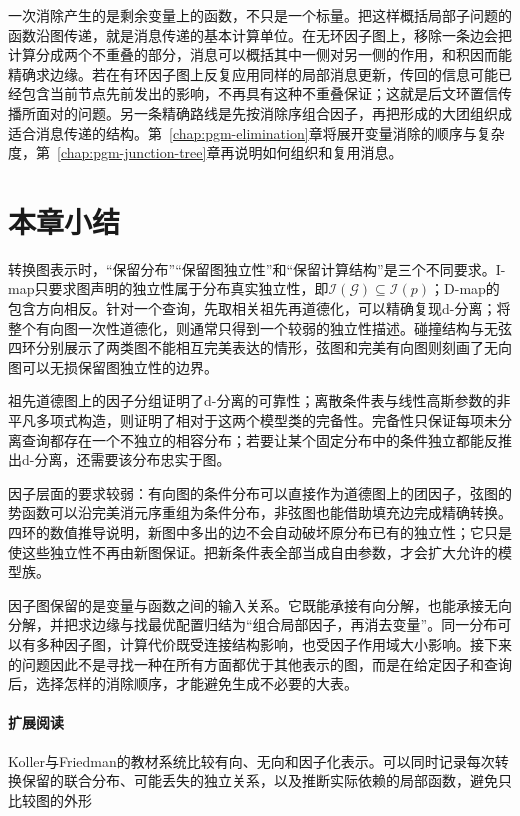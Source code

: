 一次消除产生的是剩余变量上的函数，不只是一个标量。把这样概括局部子问题的函数沿图传递，就是消息传递的基本计算单位。在无环因子图上，移除一条边会把计算分成两个不重叠的部分，消息可以概括其中一侧对另一侧的作用，和积因而能精确求边缘。若在有环因子图上反复应用同样的局部消息更新，传回的信息可能已经包含当前节点先前发出的影响，不再具有这种不重叠保证；这就是后文环置信传播所面对的问题。另一条精确路线是先按消除序组合因子，再把形成的大团组织成适合消息传递的结构。第~\ref{chap:pgm-elimination}章将展开变量消除的顺序与复杂度，第~\ref{chap:pgm-junction-tree}章再说明如何组织和复用消息。

\section{本章小结}
\label{sec:pgm-representations-summary}

转换图表示时，“保留分布”“保留图独立性”和“保留计算结构”是三个不同要求。I-map只要求图声明的独立性属于分布真实独立性，即$\mathcal{I}(\mathcal{G})\subseteq\mathcal{I}(p)$；D-map的包含方向相反。针对一个查询，先取相关祖先再道德化，可以精确复现d-分离；将整个有向图一次性道德化，则通常只得到一个较弱的独立性描述。碰撞结构与无弦四环分别展示了两类图不能相互完美表达的情形，弦图和完美有向图则刻画了无向图可以无损保留图独立性的边界。

祖先道德图上的因子分组证明了d-分离的可靠性；离散条件表与线性高斯参数的非平凡多项式构造，则证明了相对于这两个模型类的完备性。完备性只保证每项未分离查询都存在一个不独立的相容分布；若要让某个固定分布中的条件独立都能反推出d-分离，还需要该分布忠实于图。

因子层面的要求较弱：有向图的条件分布可以直接作为道德图上的团因子，弦图的势函数可以沿完美消元序重组为条件分布，非弦图也能借助填充边完成精确转换。四环的数值推导说明，新图中多出的边不会自动破坏原分布已有的独立性；它只是使这些独立性不再由新图保证。把新条件表全部当成自由参数，才会扩大允许的模型族。

因子图保留的是变量与函数之间的输入关系。它既能承接有向分解，也能承接无向分解，并把求边缘与找最优配置归结为“组合局部因子，再消去变量”。同一分布可以有多种因子图，计算代价既受连接结构影响，也受因子作用域大小影响。接下来的问题因此不是寻找一种在所有方面都优于其他表示的图，而是在给定因子和查询后，选择怎样的消除顺序，才能避免生成不必要的大表。

\paragraph{扩展阅读}
Koller与Friedman的教材系统比较有向、无向和因子化表示。可以同时记录每次转换保留的联合分布、可能丢失的独立关系，以及推断实际依赖的局部函数，避免只比较图的外形
